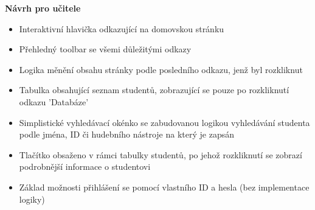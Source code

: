 \documentclass[a4paper, 11pt, twocolumn]{article}
\begin{document}
	\noindent\textbf{Návrh pro učitele} 
	\begin{itemize}
		\item Interaktivní hlavička odkazující na domovskou stránku
		\vspace{-0.2cm}
		\item Přehledný toolbar se všemi důležitými odkazy
		\vspace{-0.2cm}
		\item Logika měnění obsahu stránky podle posledního odkazu, jenž byl rozkliknut
		\vspace{-0.2cm}
		\item Tabulka obsahující seznam studentů, zobrazující se pouze po rozkliknutí odkazu 'Databáze'
		\vspace{-0.2cm}
		\item Simplistické vyhledávací okénko se zabudovanou logikou vyhledávání studenta podle jména, ID či hudebního nástroje na který je zapsán
		\vspace{-0.2cm}
		\item Tlačítko obsaženo v rámci tabulky studentů, po jehož rozkliknutí se zobrazí podrobnější informace o studentovi
		\vspace{-0.2cm}
		\item Základ možnosti přihlášení se pomocí vlastního ID a hesla (bez implementace logiky)
	\end{itemize}


	\vspace*{\fill}
	\newpage
\end{document}
